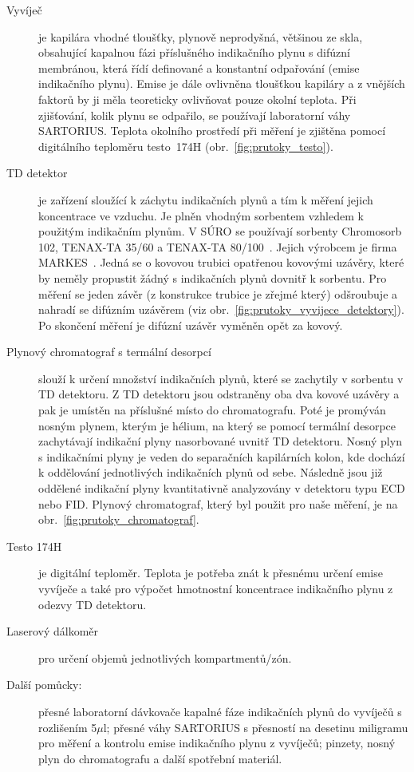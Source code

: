 \begin{description}
    \item[Vyvíječ] je kapilára vhodné tloušťky, plynově neprodyšná, většinou ze skla, obsahující kapalnou fázi příslušného indikačního plynu s difúzní membránou, která řídí definované a konstantní odpařování (emise indikačního plynu). Emise je dále ovlivněna tloušťkou kapiláry a z vnějších faktorů by ji měla teoreticky ovlivňovat pouze okolní teplota. Při zjišťování, kolik plynu se odpařilo, se používají laboratorní váhy SARTORIUS. Teplota okolního prostředí při měření je zjištěna pomocí digitálního teploměru testo~174H (obr.~\ref{fig:prutoky_testo}).
    \item[TD detektor] je zařízení sloužící k záchytu indikačních plynů a tím k měření jejich koncentrace ve vzduchu. Je plněn vhodným sorbentem vzhledem k použitým indikačním plynům. V SÚRO se používají sorbenty Chromosorb 102, TENAX-TA 35/60 a TENAX-TA 80/100~\cite{metodika}. Jejich výrobcem je firma MARKES~\cite{markes}. Jedná se o kovovou trubici opatřenou kovovými uzávěry, které by neměly propustit žádný s indikačních plynů dovnitř k sorbentu. Pro měření se jeden závěr (z konstrukce trubice je zřejmé který) odšroubuje a nahradí se difúzním uzávěrem (viz obr.~\ref{fig:prutoky_vyvijece_detektory}). Po skončení měření je difúzní uzávěr vyměněn opět za kovový.
    \item[Plynový chromatograf s termální desorpcí] slouží k určení množství indikačních plynů, které se zachytily v sorbentu v TD detektoru. Z TD detektoru jsou odstraněny oba dva kovové uzávěry a pak je umístěn na příslušné místo do chromatografu. Poté je promýván nosným plynem, kterým je hélium, na který se pomocí termální desorpce zachytávají indikační plyny nasorbované uvnitř TD detektoru. Nosný plyn s indikačními plyny je veden do separačních kapilárních kolon, kde dochází k oddělování jednotlivých indikačních plynů od sebe. Následně jsou již oddělené indikační plyny kvantitativně analyzovány v detektoru typu ECD nebo FID. Plynový chromatograf, který byl použit pro naše měření, je na obr.~\ref{fig:prutoky_chromatograf}.
    \item[Testo 174H] je digitální teploměr. Teplota je potřeba znát k přesnému určení emise vyvíječe a také pro výpočet hmotnostní koncentrace indikačního plynu z odezvy TD detektoru.
    \item[Laserový dálkoměr] pro určení objemů jednotlivých kompartmentů/zón.
    \item[Další pomůcky:] přesné laboratorní dávkovače kapalné fáze indikačních plynů do vyvíječů s rozlišením 5$\mu$l; přesné váhy SARTORIUS s přesností na desetinu miligramu pro měření a kontrolu emise indikačního plynu z vyvíječů; pinzety, nosný plyn do chromatografu a další spotřební materiál.
\end{description}


